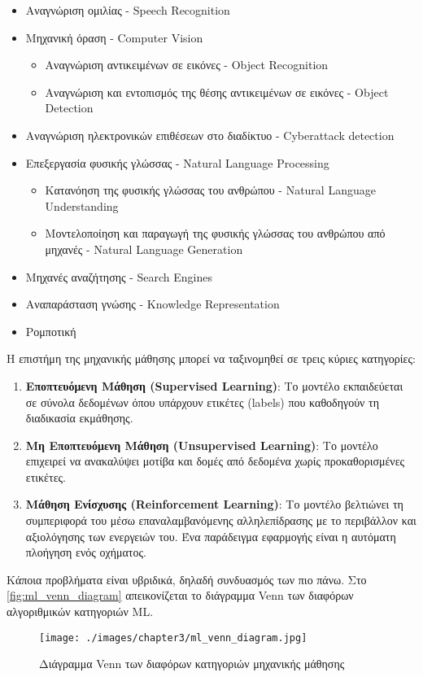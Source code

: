 \begin{itemize}
  \item{Αναγνώριση ομιλίας - Speech Recognition}
  \item{Μηχανική όραση - Computer Vision}
  \begin{itemize}
    \item{Αναγνώριση αντικειμένων σε εικόνες - Object Recognition}
    \item{Αναγνώριση και εντοπισμός της θέσης αντικειμένων σε εικόνες - Object Detection}
  \end{itemize}
  \item{Αναγνώριση ηλεκτρονικών επιθέσεων στο διαδίκτυο - Cyberattack detection}
  \item{Επεξεργασία φυσικής γλώσσας - Natural Language Processing}
  \begin{itemize}
    \item{Κατανόηση της φυσικής γλώσσας του ανθρώπου - Natural Language Understanding}
    \item{Μοντελοποίηση και παραγωγή της φυσικής γλώσσας του ανθρώπου από μηχανές - Natural Language Generation}
  \end{itemize}
  \item{Μηχανές αναζήτησης - Search Engines}
  \item{Αναπαράσταση γνώσης - Knowledge Representation}
  \item{Ρομποτική}
\end{itemize}

Η επιστήμη της μηχανικής μάθησης μπορεί να ταξινομηθεί σε τρεις κύριες κατηγορίες:
\begin{enumerate}
    \item \textbf{Εποπτευόμενη Μάθηση (Supervised Learning)}: Το μοντέλο εκπαιδεύεται σε σύνολα δεδομένων όπου υπάρχουν ετικέτες (labels) που καθοδηγούν τη διαδικασία εκμάθησης.
    \item \textbf{Μη Εποπτευόμενη Μάθηση (Unsupervised Learning)}: Το μοντέλο επιχειρεί να ανακαλύψει μοτίβα και δομές από δεδομένα χωρίς προκαθορισμένες ετικέτες.
    \item \textbf{Μάθηση Ενίσχυσης (Reinforcement Learning)}: Το μοντέλο βελτιώνει τη συμπεριφορά του μέσω επαναλαμβανόμενης αλληλεπίδρασης με το περιβάλλον και αξιολόγησης των ενεργειών του. Ένα παράδειγμα εφαρμογής
    είναι η αυτόματη πλοήγηση ενός οχήματος.
\end{enumerate}

Kάποια προβλήματα είναι υβριδικά, δηλαδή συνδυασμός των πιο πάνω.
Στο \autoref{fig:ml_venn_diagram} απεικονίζεται το διάγραμμα Venn των διαφόρων 
αλγοριθμικών κατηγοριών ML.
\begin{figure}[H]
  \centering
  \texttt{[image: ./images/chapter3/ml\_venn\_diagram.jpg]}
  \caption[Διάγραμμα Venn των διαφόρων κατηγοριών μηχανικής μάθησης]{Διάγραμμα Venn των διαφόρων κατηγοριών μηχανικής μάθησης}
  \label{fig:ml_venn_diagram}
\end{figure}

